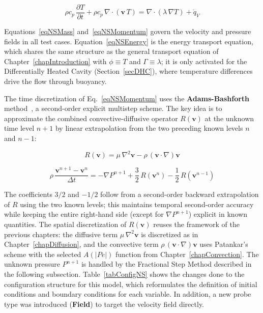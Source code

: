 \begin{equation}\label{eqNSEnergy}
    \rho c_p\,\frac{\partial T}{\partial t} + \rho c_p\,\nabla \cdot (\mathbf{v}\,T) = \nabla \cdot (\lambda\,\nabla T) + \dot{q}_V
\end{equation}

Equations~\eqref{eqNSMass} and~\eqref{eqNSMomentum} govern the velocity and pressure fields in all test cases. Equation~\eqref{eqNSEnergy} is the energy transport equation, which shares the same structure as the general transport equation of Chapter~\ref{chapIntroduction} with $\phi \equiv T$ and $\Gamma \equiv \lambda$; it is only activated for the Differentially Heated Cavity (Section~\ref{secDHC}), where temperature differences drive the flow through buoyancy.

The time discretization of Eq.~\eqref{eqNSMomentum} uses the \textbf{Adams-Bashforth} method~\cite{Ferziger2002}, a second-order explicit multistep scheme. The key idea is to approximate the combined convective-diffusive operator $R(\mathbf{v})$ at the unknown time level $n+1$ by linear extrapolation from the two preceding known levels $n$ and $n-1$:

\begin{equation}\label{eqRv}
    R(\mathbf{v}) = \mu\,\nabla^2 \mathbf{v} - \rho\,(\mathbf{v} \cdot \nabla)\mathbf{v}
\end{equation}

\begin{equation}\label{eqAdamsBashforth}
    \rho\,\frac{\mathbf{v}^{n+1} - \mathbf{v}^n}{\Delta t} = -\nabla P^{n+1} + \frac{3}{2}\,R(\mathbf{v}^n) - \frac{1}{2}\,R(\mathbf{v}^{n-1})
\end{equation}

The coefficients $3/2$ and $-1/2$ follow from a second-order backward extrapolation of $R$ using the two known levels; this maintains temporal second-order accuracy while keeping the entire right-hand side (except for $\nabla P^{n+1}$) explicit in known quantities. The spatial discretization of $R(\mathbf{v})$ reuses the framework of the previous chapters: the diffusive term $\mu\,\nabla^2\mathbf{v}$ is discretized as in Chapter~\ref{chapDiffusion}, and the convective term $\rho\,(\mathbf{v} \cdot \nabla)\mathbf{v}$ uses Patankar's scheme with the selected $A(|Pe|)$ function from Chapter~\ref{chapConvection}. The unknown pressure $P^{n+1}$ is handled by the Fractional Step Method described in the following subsection. Table~\ref{tabConfigNS} shows the changes done to the configuration structure for this model, which reformulates the definition of initial conditions and boundary conditions for each variable. In addition, a new probe type was introduced (\textbf{Field}) to target the velocity field directly.

